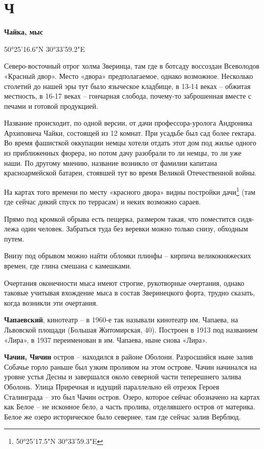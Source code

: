 \chapter*{Ч}

\textbf{Чайка, мыс}

50°25'16.6"N 30°33'59.2"E

Северо-восточный отрог холма Зверинца, там где в ботсаду воссоздан Всеволодов «Красный двор». Место «двора» предполагаемое, однако возможное. Несколько столетий до нашей эры тут было языческое кладбище, в 13-14 веках – обжитая местность, в 16-17 веках – гончарная слобода, почему-то заброшенная вместе с печами и готовой продукцией.

Название происходит, по одной версии, от дачи профессора-уролога Андроника Архиповича Чайки, состоящей из 12 комнат. При усадьбе был сад более гектара. Во время фашисткой оккупации немцы хотели отдать этот дом под жилье одного из приближенных фюрера, но потом дачу разобрали то ли немцы, то ли уже наши. По другому мнению, название возникло от фамилии капитана красноармейской батареи, стоявшей тут во время Великой Отечественной войны.

На картах того времени по месту «красного двора» видны постройки дачи\footnote{50°25'17.5"N 30°33'59.3"E} (там где сейчас дикий спуск по террасам) и неких возможно сараев.

Прямо под кромкой обрыва есть пещерка, размером такая, что поместится сидя-лежа один человек. Забраться туда без веревки можно только снизу, обходным путем.

Внизу под обрывом можно найти обломки плинфы – кирпича великокняжеских времен, где глина смешана с камешками.

Очертания оконечности мыса имеют строгие, рукотворные очертания, однако таковые учитывая вхождение мыса в состав Зверинецкого форта, трудно сказать, когда возникли эти очертания.\\ 

\medskip

\textbf{Чапаевский}, кинотеатр – в 1960-е так называли кинотеатр им. Чапаева, на Львовской площади (Большая Житомирская, 40). Построен в 1913 под названием «Лира», в 1937 переименован в им. Чапаева, ныне снова «Лира».\\

\medskip

\textbf{Чачин, Чичин} остров – находился в районе Оболони. Разросшийся ныне залив Собачье горло раньше был узким проливом на этом острове. Чачин начинался на уровне устья Десны и завершался около северной части теперешнего залива Оболонь. Улица Приречная и идущий параллельно ей отрезок Героев Сталинграда – это был Чачин остров. Озеро, которое сейчас обозначено на картах как Белое – не исконное бело, а часть пролива, отделявшего остров от материка. Белое же озеро историческое было севернее, там где сейчас залив Верблюд.\\

